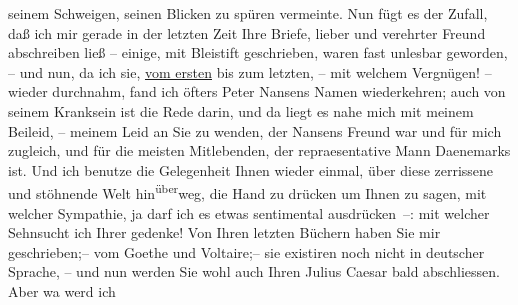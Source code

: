 \begin{ledgroupsized}[t]{13cm}
                    seinem Schweigen, seinen Blicken zu spüren vermeinte. Nun fügt es der Zufall,
                    daß ich mir gerade in der letzten Zeit Ihre Briefe, lieber und verehrter Freund
                    abschreiben ließ – einige, mit Bleistift geschrieben, waren fast unlesbar
                    geworden, – und nun, da ich sie, \uline{vom ersten} bis
                    zum letzten,  – mit welchem Vergnügen! –
                    wieder durchnahm, fand ich öfters Peter
                        Nansens Namen wiederkehren; auch von seinem Kranksein ist die Rede
                    darin, und da liegt es nahe mich mit meinem Beileid, – meinem Leid an Sie zu
                    wenden, der Nansens Freund war und für mich
                    zugleich, und für die meisten Mitlebenden, {\pb}der repraesentative Mann Daenemarks ist. Und
                    ich benutze die Gelegenheit Ihnen wieder einmal, über diese zerrissene und
                    stöhnende Welt hin\substVorne{}\textsuperscript{über}\substDazwischen{}weg\substHinten{}, die Hand zu drücken um Ihnen zu sagen, mit welcher Sympathie, ja darf
                    ich es etwas sentimental ausdrücken –: mit welcher Sehnsucht ich Ihrer gedenke!
                    Von Ihren letzten Büchern haben Sie mir geschrieben;– vom Goethe und Voltaire;– sie existiren noch nicht in deutscher Sprache, – und nun werden Sie wohl
                    auch Ihren Julius Caesar bald abschliessen. Aber wa{\geminationn} werd ich

\end{ledgroupsized}
